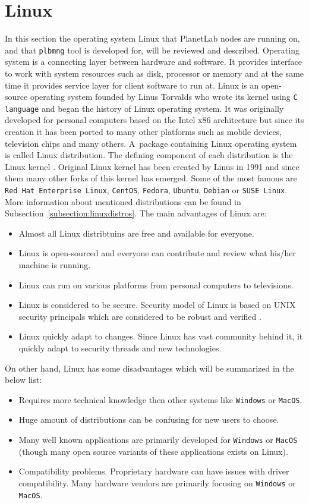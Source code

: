 \section{Linux}
In this section the operating system Linux that PlanetLab nodes are running on, and that \texttt{plbmng} tool is developed for, will be reviewed and described. Operating system is a connecting layer between hardware and software. It provides interface to work with system resources such as disk, processor or memory and at the same time it provides service layer for client software to run at. Linux is an open-source operating system founded by Linus Torvalds who wrote its kernel using \texttt{C language} and began the history of Linux operating system. It was originally developed for personal computers based on the Intel x86 architecture but since its creation it has been ported to many other platforms such as mobile devices, television chips and many others. A~package containing Linux operating system is called Linux distribution. The defining component of each distribution is the Linux kernel \cite{eckert2012linux+}. Original Linux kernel has been created by Linus in 1991 \cite{linuxintro} and since them many other forks of this kernel has emerged. Some of the most famous are \texttt{Red Hat Enterprise Linux},  \texttt{CentOS}, \texttt{Fedora}, \texttt{Ubuntu},  \texttt{Debian} or \texttt{SUSE Linux}. More information about mentioned distributions can be found in Subsection~\ref{subsection:linuxdistros}. The main advantages of Linux are:
\begin{itemize}
	\item Almost all Linux distribtuins are free and available for everyone.
	\item Linux is open-sourced and everyone can contribute and review what his/her machine is running.
	\item Linux can run on various platforms from personal computers to televisions.
	\item Linux is considered to be secure. Security model of Linux is based on UNIX security principals which are considered to be robust and verified \cite{BILHEQP2xqVnjbQi}. 
	\item Linux quickly adapt to changes. Since Linux has vast community behind it, it quickly adapt to security threads and new technologies.
\end{itemize}
On other hand, Linux has some disadvantages which will be summarized in the below list:
\begin{itemize}
	\item Requires more technical knowledge then other systems like \texttt{Windows} or \texttt{MacOS}.
	\item Huge amount of distributions can be confusing for new users to choose. 
	\item Many well known applications are primarily developed for \texttt{Windows} or \texttt{MacOS} (though many open source variants of these applications exists on Linux).
	\item Compatibility problems. Proprietary hardware can have issues with driver compatibility. Many hardware vendors are primarily focusing on \texttt{Windows} or \texttt{MacOS}.
\end{itemize}
